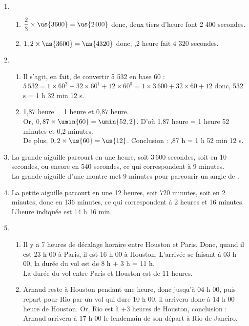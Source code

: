 \ \\ [-5mm]
   \begin{enumerate}
      \item
         \begin{enumerate}
            \item $\dfrac23\times\us{3600} =\us{2400}$ donc, {\blue deux tiers d'heure font 2 400 secondes.} \smallskip
            \item $1,2\times\us{3600} =\us{4320}$ donc, {,2 heure fait 4 320 secondes.}
         \end{enumerate}
      \setcounter{enumi}{1}
      \item
         \begin{enumerate}
            \item Il s'agit, en fait, de convertir 5 532 en base 60 : \\
               $5\,532 =1\times60^2+32\times60^1+12\times60^0 =1\times3\,600+32\times60+12$
               donc, { 532 s = 1 h 32 min 12 s.}
            \item 1,87 heure = 1 heure et 0,87 heure. \\
               Or, $0,87\times\umin{60} =\umin{52,2}$. D'où 1,87 heure = 1 heure 52 minutes et 0,2 minutes. \\
               De plus, $0,2\times\us{60} =\us{12}$. Conclusion : {,87 h = 1 h 52 min 12 s}.
         \end{enumerate}
       \setcounter{enumi}{2}
       \item La grande aiguille parcourt   en une heure, soit 3\,600 secondes, soit   en 10 secondes, ou encore   en 540 secondes, ce qui correspondent à 9 minutes. \\
         {\blue La grande aiguille d'une montre met 9 minutes pour parcourir un angle de  }.
      \item La petite aiguille parcourt   en une 12 heures, soit 720 minutes, soit  en 2 minutes, donc   en 136 minutes, ce qui correspondent à 2 heures et 16 minutes. \\
         {\blue L'heure indiquée est 14 h 16 min}.
      \item
         \begin{enumerate}
            \item Il y a 7 heures de décalage horaire entre Houston et Paris. Donc, quand il est 23 h 00 à Paris, il est 16 h 00 à Houston. L'arrivée se faisant à 03 h 00, la durée du vol est de 8 h + 3 h = 11 h. \\
               {\blue La durée du vol entre Paris et Houston est de 11 heures}.
            \item Arnaud reste à Houston pendant une heure, donc jusqu'à 04 h 00, puis repart pour Rio par un vol qui dure 10 h 00, il arrivera donc à 14 h 00 heure de Houston. Or, Rio est à $+3$ heures de Houston, conclusion : \\
               {\blue Arnaud arrivera à 17 h 00 le lendemain de son départ à Rio de Janeiro}.
         \end{enumerate}
   \end{enumerate}
